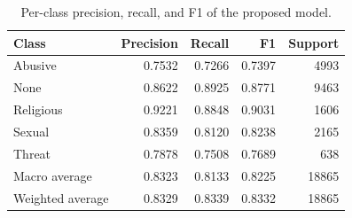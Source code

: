 \begin{table}
\caption{Per-class precision, recall, and F1 of the proposed model.}
\label{tab:per_class_report}
\begin{tabular}{lrrrr}
\toprule
Class & Precision & Recall & F1 & Support \\
\midrule
Abusive & 0.7532 & 0.7266 & 0.7397 & 4993 \\
None & 0.8622 & 0.8925 & 0.8771 & 9463 \\
Religious & 0.9221 & 0.8848 & 0.9031 & 1606 \\
Sexual & 0.8359 & 0.8120 & 0.8238 & 2165 \\
Threat & 0.7878 & 0.7508 & 0.7689 & 638 \\
Macro average & 0.8323 & 0.8133 & 0.8225 & 18865 \\
Weighted average & 0.8329 & 0.8339 & 0.8332 & 18865 \\
\bottomrule
\end{tabular}
\end{table}
